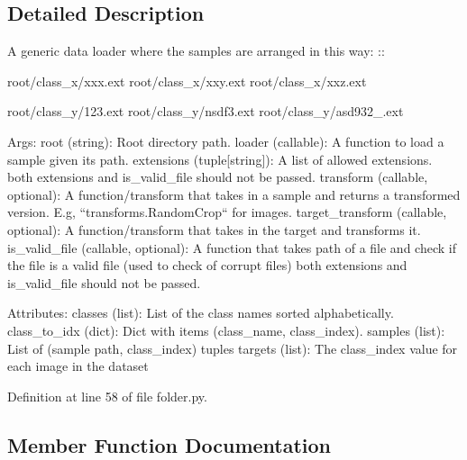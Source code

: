 \subsection{Detailed Description}
\begin{DoxyVerb}A generic data loader where the samples are arranged in this way: ::

    root/class_x/xxx.ext
    root/class_x/xxy.ext
    root/class_x/xxz.ext

    root/class_y/123.ext
    root/class_y/nsdf3.ext
    root/class_y/asd932_.ext

Args:
    root (string): Root directory path.
    loader (callable): A function to load a sample given its path.
    extensions (tuple[string]): A list of allowed extensions.
        both extensions and is_valid_file should not be passed.
    transform (callable, optional): A function/transform that takes in
        a sample and returns a transformed version.
        E.g, ``transforms.RandomCrop`` for images.
    target_transform (callable, optional): A function/transform that takes
        in the target and transforms it.
    is_valid_file (callable, optional): A function that takes path of a file
        and check if the file is a valid file (used to check of corrupt files)
        both extensions and is_valid_file should not be passed.

 Attributes:
    classes (list): List of the class names sorted alphabetically.
    class_to_idx (dict): Dict with items (class_name, class_index).
    samples (list): List of (sample path, class_index) tuples
    targets (list): The class_index value for each image in the dataset
\end{DoxyVerb}
 

Definition at line 58 of file folder.\+py.



\subsection{Member Function Documentation}
\mbox{\label{classtorchvision_1_1datasets_1_1folder_1_1DatasetFolder_a5b6284f875125761b82b002617a2eda4}} 
